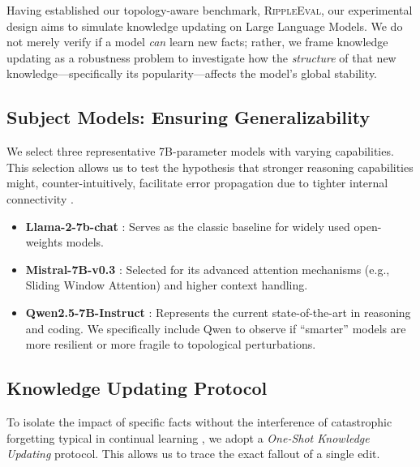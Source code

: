 





Having established our topology-aware benchmark, \textsc{RippleEval}, our experimental design aims to simulate knowledge updating on Large Language Models. We do not merely verify if a model \textit{can} learn new facts; rather, we frame knowledge updating as a robustness problem to investigate how the \textit{structure} of that new knowledge—specifically its popularity—affects the model's global stability.

\subsection{Subject Models: Ensuring Generalizability}
We select three representative 7B-parameter models with varying capabilities. This selection allows us to test the hypothesis that stronger reasoning capabilities might, counter-intuitively, facilitate error propagation due to tighter internal connectivity \cite{wei2022chain}.
\begin{itemize}
    \item \textbf{Llama-2-7b-chat} \cite{touvron2023llama2}: Serves as the classic baseline for widely used open-weights models.
    \item \textbf{Mistral-7B-v0.3} \cite{jiang2023mistral}: Selected for its advanced attention mechanisms (e.g., Sliding Window Attention) and higher context handling.
    \item \textbf{Qwen2.5-7B-Instruct} \cite{bai2023qwen}: Represents the current state-of-the-art in reasoning and coding. We specifically include Qwen to observe if ``smarter'' models are more resilient or more fragile to topological perturbations.
\end{itemize}

\subsection{Knowledge Updating Protocol}
To isolate the impact of specific facts without the interference of catastrophic forgetting typical in continual learning \cite{kirkpatrick2017overcoming}, we adopt a \textit{One-Shot Knowledge Updating} protocol. This allows us to trace the exact fallout of a single edit.

